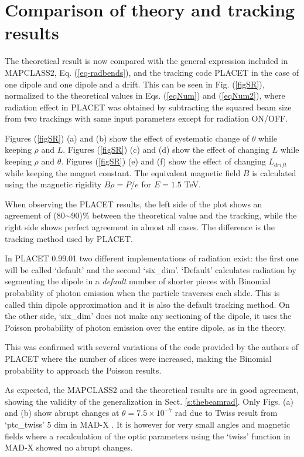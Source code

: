 \section{Comparison of theory and tracking results}\label{s:comparison}
The theoretical result is now compared with the general expression included in MAPCLASS2, Eq. (\ref{eq-radbends}), and the tracking code PLACET in the case of one dipole and one dipole and a drift. This can be seen in Fig. (\ref{figSR}), normalized to the theoretical values in Eqs. (\ref{eqNum}) and (\ref{eqNum2}), where radiation effect in PLACET was obtained by subtracting the squared beam size from two trackings with same input parameters except for radiation ON/OFF.\par
Figures (\ref{figSR}) (a) and (b) show the effect of systematic change of $\theta$ while keeping $\rho$ and $L$. Figures (\ref{figSR}) (c) and (d) show the effect of changing $L$ while keeping $\rho$ and $\theta$. Figures (\ref{figSR}) (e) and (f) show the effect of changing $L_{drift}$ while keeping the magnet constant. The equivalent magnetic field $B$ is calculated using the magnetic rigidity $B\rho=P/e$ for $E=1.5 $ TeV.\par
When observing the PLACET results, the left side of the plot shows an agreement of (80$\sim$90)\% between the theoretical value and the tracking, while the right side shows perfect agreement in almost all cases. The difference is the tracking method used by PLACET.\par
In PLACET 0.99.01 two different implementations of radiation exist: the first one will be called `default' and the second `six\_dim'. `Default' calculates radiation by segmenting the dipole in a \emph{default} number of shorter pieces with Binomial probability of photon emission when the particle traverses each slide. This is called thin dipole approximation and it is also the default tracking method. On the other side, `six\_dim' does not make any sectioning of the dipole, it uses the Poisson probability of photon emission over the entire  dipole, as in the theory.\par
This was confirmed with several variations of the code provided by the authors of PLACET where the number of slices were increased, making the Binomial probability to approach the Poisson results.\par
As expected, the MAPCLASS2 and the theoretical results are in good agreement, showing the validity of the generalization in Sect. \ref{s:thebeamrad}. Only Figs. (a) and (b) show abrupt changes at $\theta=7.5\times10^{-7}$ rad due to Twiss result from `ptc\_twiss' 5 dim in MAD-X \cite{MADX}. It is however for very small angles and magnetic fields where a recalculation of the optic parameters using the `twiss' function in MAD-X showed no abrupt changes.\par
